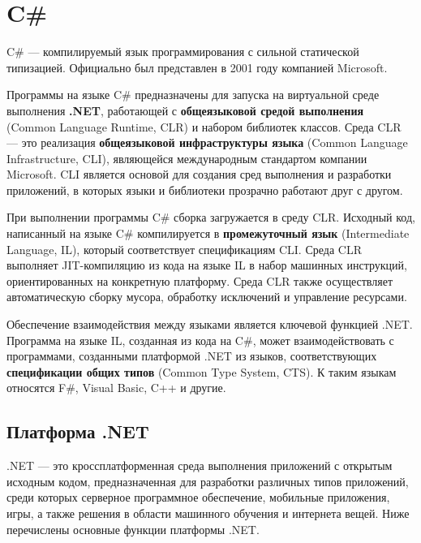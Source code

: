 \section{C\#}
C\# \cite{dotnet_tour} --- компилируемый язык программирования с сильной статической типизацией. Официально был представлен в 2001 году компанией Microsoft.

Программы на языке C\# предназначены для запуска на виртуальной среде выполнения \textbf{.NET}, работающей с \textbf{общеязыковой средой выполнения} (Common Language Runtime, CLR) и набором библиотек классов. Среда CLR --- это реализация \textbf{общеязыковой инфраструктуры языка} (Common Language Infrastructure, CLI), являющейся международным стандартом компании Microsoft. CLI является основой для создания сред выполнения и разработки приложений, в которых языки и библиотеки прозрачно работают друг с другом. \cite{dotnet_tour}

При выполнении программы C\# сборка загружается в среду CLR. Исходный код, написанный на языке C\# компилируется в \textbf{промежуточный язык} (Intermediate Language, IL), который соответствует спецификациям CLI. Среда CLR выполняет JIT-компиляцию из кода на языке IL в набор машинных инструкций, ориентированных на конкретную платформу. Среда CLR также осуществляет автоматическую сборку мусора, обработку исключений и управление ресурсами. \cite{dotnet_tour}

Обеспечение взаимодействия между языками является ключевой функцией .NET. Программа на языке IL, созданная из кода на C\#, может взаимодействовать с программами, созданными платформой .NET из языков, соответствующих \textbf{спецификации общих типов} (Common Type System, CTS). К таким языкам относятся F\#, Visual Basic, C++ и другие. \cite{dotnet}



\subsection{Платформа .NET}

.NET \cite{dotnet} --- это кроссплатформенная среда выполнения приложений с открытым исходным кодом, предназначенная для разработки различных типов приложений, среди которых серверное программное обеспечение, мобильные приложения, игры, а также решения в области машинного обучения и интернета вещей. Ниже перечислены основные функции платформы .NET. \cite{dotnet_intro}

